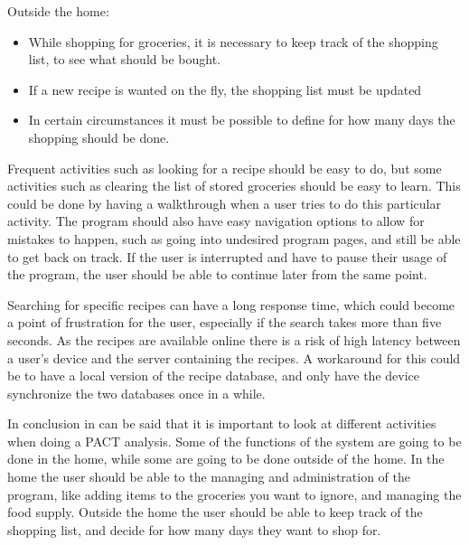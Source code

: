 Outside the home:
\begin{itemize}
\item While shopping for groceries, it is necessary to keep track of the shopping list, to see what should be bought.
\item If a new recipe is wanted on the fly, the shopping list must be updated
\item In certain circumstances it must be possible to define for how many days the shopping should be done.
\end{itemize}

Frequent activities such as looking for a recipe should be easy to do, but some activities such as clearing the list of stored groceries should be easy to learn. This could be done by having a walkthrough when a user tries to do this particular activity. The program should also have easy navigation options to allow for mistakes to happen, such as going into undesired program pages, and still be able to get back on track. If the user is interrupted and have to pause their usage of the program, the user should be able to continue later from the same point.

Searching for specific recipes can have a long response time, which could become a point of frustration for the user, especially if the search takes more than five seconds. As the recipes are available online there is a risk of high latency between a user's device and the server containing the recipes. A workaround for this could be to have a local version of the recipe database, and only have the device synchronize the two databases once in a while.

In conclusion in can be said that it is important to look at different activities when doing a PACT analysis. Some of the functions of the system are going to be done in the home, while some are going to be done outside of the home. In the home the user should be able to the managing and administration of the program, like adding items to the groceries you want to ignore, and managing the food supply. Outside the home the user should be able to keep track of the shopping list, and decide for how many days they want to shop for.